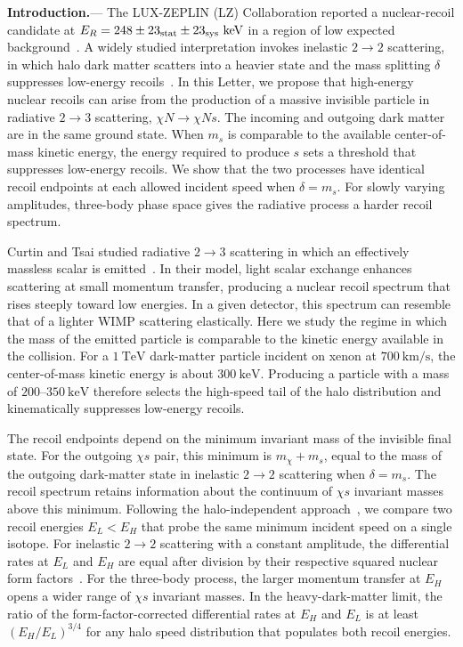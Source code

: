 \documentclass[prd,showpacs,preprintnumbers,amsmath,amssymb,twocolumn,
superscriptaddress,notitlepage]{revtex4-2}
\begin{document}
\noindent\textbf{Introduction.}---
The LUX-ZEPLIN (LZ) Collaboration reported a nuclear-recoil candidate
at $E_R=248\pm23_{\rm stat}\pm23_{\rm sys}~\mathrm{keV}$ in a region
of low expected background~\cite{LZ:2026axp}. A widely studied
interpretation invokes inelastic $2\to2$ scattering, in which halo
dark matter scatters into a heavier state and the mass splitting
$\delta$ suppresses low-energy recoils~\cite{Bramante:2016rdh,Su:2026rwz,Fan:2026kxx,Freese:2026sga}.
In this Letter, we propose that high-energy nuclear recoils can arise
from the production of a massive invisible particle in radiative
$2\to3$ scattering, $\chi N\to\chi N s$. The incoming and outgoing
dark matter are in the same ground state. When $m_s$ is comparable
to the available center-of-mass kinetic energy, the energy required
to produce $s$ sets a threshold that suppresses low-energy recoils.
We show that the two processes have identical recoil endpoints at
each allowed incident speed when $\delta=m_s$. For slowly varying
amplitudes, three-body phase space gives the radiative process a
harder recoil spectrum.

Curtin and Tsai studied radiative $2\to3$ scattering in which an
effectively massless scalar is emitted~\cite{Curtin:2014afa}.
In their model, light scalar exchange enhances scattering at small
momentum transfer, producing a nuclear recoil spectrum that rises
steeply toward low energies. In a given detector, this spectrum can
resemble that of a lighter WIMP scattering elastically.
Here we study the regime in which
the mass of the emitted particle is comparable to the kinetic
energy available in the collision. For a $1~\mathrm{TeV}$ dark-matter
particle incident on xenon at $700~\mathrm{km/s}$, the center-of-mass
kinetic energy is about $300~\mathrm{keV}$. Producing a particle
with a mass of $200$--$350~\mathrm{keV}$ therefore selects the
high-speed tail of the halo distribution and kinematically
suppresses low-energy recoils.

The recoil endpoints depend on the minimum invariant mass of the
invisible final state. For the outgoing $\chi s$ pair, this minimum
is $m_\chi+m_s$, equal to the mass of the outgoing dark-matter state
in inelastic $2\to2$ scattering when $\delta=m_s$. The recoil
spectrum retains information about the continuum of $\chi s$
invariant masses above this minimum. 
Following the halo-independent approach~\cite{Fox:2010bu, Fox:2010bz}, 
we compare two recoil energies
$E_L<E_H$ that probe the same minimum incident speed on a single
isotope. For inelastic $2\to2$ scattering with a constant amplitude,
the differential rates at $E_L$ and $E_H$ are equal after division
by their respective squared nuclear form
factors~\cite{Bozorgnia:2013hsa, Fox:2013pia}.
For the three-body process, the larger momentum transfer at $E_H$ 
opens a wider range of $\chi s$
invariant masses. In the heavy-dark-matter limit, the ratio of the
form-factor-corrected differential rates at $E_H$ and $E_L$ is at
least $(E_H/E_L)^{3/4}$ for any halo speed distribution that
populates both recoil energies.
\end{document}

